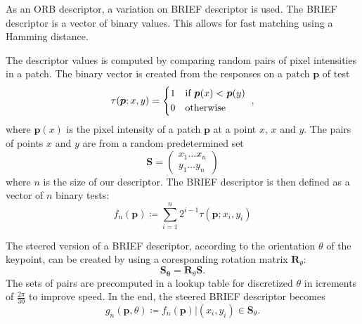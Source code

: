 As an ORB descriptor, a variation on BRIEF descriptor is used. The BRIEF descriptor is a vector of binary values. This allows for fast matching using a Hamming distance.

The descriptor values is computed by comparing random pairs of pixel intensities in a patch. The binary vector is created from the responses on a patch $\boldsymbol{p}$ of test
\begin{equation}
    \tau(\boldsymbol{p};x,y)=
    \begin{cases*}
        1 & if $\boldsymbol{p}(x) < \boldsymbol{p}(y)$ \\
        0 & otherwise
    \end{cases*}, 
\end{equation}
where $\boldsymbol{p}(x)$ is the pixel intensity of a patch $\boldsymbol{p}$ at a point $x$, $x$ and $y$. The pairs of points $x$ and $y$ are from a random predetermined set
\begin{equation}
    \boldsymbol{S} =
    \begin{pmatrix}
        x_1 \dots x_n \\
        y_1 \dots y_n
    \end{pmatrix} 
\end{equation}
where $n$ is the size of our descriptor. The BRIEF descriptor is then defined as a vector of $n$ binary tests:
\begin{equation}
    f_n(\boldsymbol{p}) \coloneqq \sum_{i=1}^{n} 2^{i-1}\tau(\boldsymbol{p};x_i, y_i)
\end{equation}

The steered version of a BRIEF descriptor, according to the orientation $\theta$ of the keypoint, can be created by using a coresponding rotation matrix $\boldsymbol{R}_\theta$:
\begin{equation}
    \boldsymbol{S_\theta} = \boldsymbol{R}_\theta \boldsymbol{S}.
\end{equation}
The sets of pairs are precomputed in a lookup table for discretized $\theta$ in icrements of $\frac{2\pi}{30}$ to improve speed. In the end, the steered BRIEF descriptor becomes
\begin{equation}
    g_n(\boldsymbol{p}, \theta) \coloneqq f_n(\boldsymbol{p}) | (x_i, y_i) \in \boldsymbol{S}_\theta.
\end{equation}

